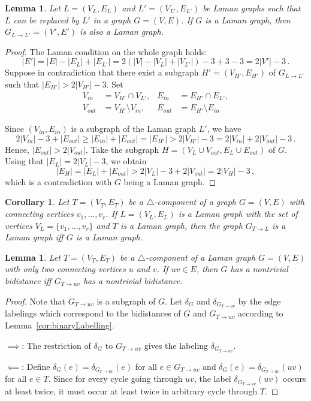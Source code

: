 \documentclass[a4paper, 11pt]{article}
\newcommand{\trcomp}{$\triangle$-component}
\newtheorem{lem}[thm]{Lemma}
\newtheorem{cor}[thm]{Corollary}
\theoremstyle{definition}
\begin{document}
\begin{lem}
Let $L=(V_L, E_L)$ and $L'=(V_{L'}, E_{L'})$ be Laman graphs such that $L$ can be replaced by $L'$ in a graph $G=(V,E)$. If $G$ is a Laman graph, then $G_{L\rightarrow L'}=(V',E')$ is also a Laman graph. 
\end{lem}
\begin{proof}
The Laman condition on the whole graph holds:
$$
|E'|=|E|- |E_{L}|+ |E_{L'}|=2(|V|- |V_{L}|+ |V_{L'}|)-3+3-3=2|V'|-3\,.
$$
Suppose in contradiction that there exist a subgraph ${H'}=(V_{H'},E_{H'})$ of $G_{L\rightarrow L'}$ such that $|E_{H'}|> 2|V_{H'}|-3$. Set 
\begin{align*}
 V_{in}&=V_{H'}\cap V_{L'}, &E_{in}&=E_{H'}\cap E_{L'}, \\
 V_{out}&=V_{H'} \setminus V_{in}, & E_{out}&=E_{H'} \setminus E_{in}
\end{align*}

Since $(V_{in}, E_{in})$ is a subgraph of the Laman graph $L'$, we have
$$
2|V_{in}|-3 +|E_{out}|\geq  |E_{in}|+|E_{out}|=|E_{H'}|> 2|V_{{H'}}|-3=2|V_{in}|+2|V_{out}|-3\,.
$$
Hence, $|E_{out}|>2|V_{out}|$. Take the subgraph $H=(V_L \cup V_{out}, E_L \cup E_{out})$ of $G$. Using that $|E_L|=2|V_L|-3$, we obtain
$$|E_H|=|E_L|+|E_{out}|>2|V_L|-3+2|V_{out}|=2|V_H|-3\,,$$
which is  a contradiction with $G$ being a  Laman graph.
\end{proof}

\begin{cor}
\label{cor:replaceTrcompByLaman}
Let $T=(V_T,E_T)$ be a \trcomp{} of a graph $G=(V,E)$ with connecting vertices $v_1, \dots, v_r$. If $L=(V_L,E_L)$ is a Laman graph with the set of vertices $V_L=\{v_1, \dots, v_r\}$ and $T$ is a Laman graph, then the graph $G_{T\rightarrow L}$ is a Laman graph iff $G$ is a Laman graph.
\end{cor}

\begin{lem}
Let $T=(V_T,E_T)$ be a \trcomp{} of a Laman graph $G=(V,E)$ with only two connecting vertices $u$ and $v$. If $uv\in E$, then $G$ has a nontrivial bidistance iff $G_{T\rightarrow uv}$ has a nontrivial bidistance.
\end{lem}
\begin{proof}
Note that $G_{T\rightarrow uv}$ is a subgraph of $G$. Let $\delta_G$ and $\delta_{G_{T\rightarrow uv}}$ by the edge labelings which correspond to the bidistances of $G$ and $G_{T\rightarrow uv}$ according to Lemma~\ref{cor:binaryLabelling}.

$\implies$: The restriction of $\delta_G$ to  $G_{T\rightarrow uv}$ gives the labeling $\delta_{G_{T\rightarrow uv}}$.

$\impliedby$: Define $\delta_G(e)=\delta_{G_{T\rightarrow uv}}(e)$ for all $e\in G_{T\rightarrow uv}$ and $\delta_G(e)=\delta_{G_{T\rightarrow uv}}(uv)$ for all $e\in T$. Since for every cycle going through $uv$, the label $\delta_{G_{T\rightarrow uv}}(uv)$ occurs at least twice, it must occur at least twice in arbitrary cycle through $T$.
\end{proof}
\end{document}
